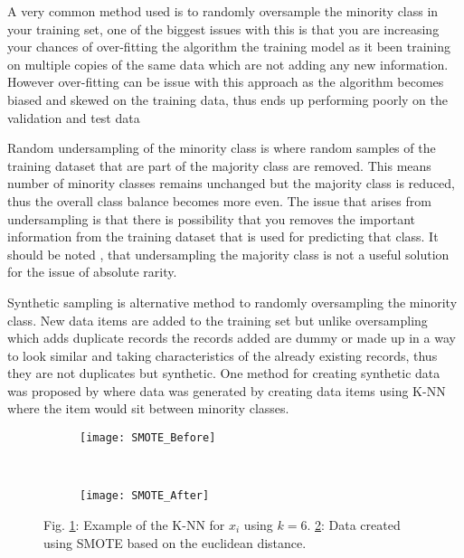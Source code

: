 A very common method used is to randomly oversample the minority class in your training set, one of the biggest issues with this is that you are increasing your chances of over-fitting the algorithm the training model as it been training on multiple copies of the same data which are not adding any new information. However over-fitting can be issue with this approach as the algorithm becomes biased and skewed on the training data, thus ends up performing poorly on the validation and test data \cite[see][]{hawkins_problem_2004}

Random undersampling of the minority class is where random samples of the training dataset that are part of the majority class are removed. This means number of minority classes remains unchanged but the majority class is reduced, thus the overall class balance becomes more even. The issue that arises from undersampling is that there is possibility that you removes the important information from the training dataset that is used for predicting that class. It should be noted \cite{kennedy_credit_2013}, that undersampling the majority class is not a useful solution for the issue of absolute rarity.

Synthetic sampling  is alternative method to randomly oversampling the minority class. New data items are added to the training set but unlike oversampling which adds duplicate records the records added are dummy or made up in a way to look similar and taking characteristics of the already existing records, thus they are not duplicates but synthetic. One method for creating synthetic data was proposed by \citep{chawla_smote:_2002} where data was generated by creating data items using K-NN where the item would sit between minority classes.

\begin{figure}[H]
	\centering
	\begin{subfigure}[b]{0.32\textwidth}
		\captionsetup{font=scriptsize}
		\texttt{[image: SMOTE\_Before]}\caption{}
		\label{fig:SMOTE_Before}
	\end{subfigure}  ~\quad
	\begin{subfigure}[b]{0.32\textwidth}
		\captionsetup{font=scriptsize}
		\texttt{[image: SMOTE\_After]}
		\caption{}
		\label{fig:SMOTE_After}
	\end{subfigure}
	\caption{Fig. \ref{fig:SMOTE_Before}: Example of the K-NN for $x_i$ using $k = 6$. \ref{fig:SMOTE_After}: Data created using SMOTE based on the euclidean distance.\\
		\cite[Source:][]{he_learning_2009}}
	\label{fig:smoteExample}
\end{figure}

